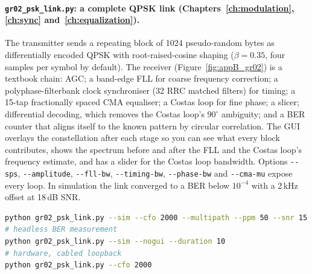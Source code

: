 \paragraph{\texttt{gr02\_psk\_link.py}: a complete QPSK link (Chapters~\ref{ch:modulation},
\ref{ch:sync} and~\ref{ch:equalization}).} The transmitter sends a repeating block of 1024
pseudo-random bytes as differentially encoded QPSK with root-raised-cosine shaping ($\beta=0.35$,
four samples per symbol by default). The receiver (Figure~\ref{fig:appB_gr02}) is a textbook chain: AGC; a band-edge FLL for
coarse frequency correction; a polyphase-filterbank clock synchroniser (32 RRC matched filters) for
timing; a 15-tap fractionally spaced CMA equaliser; a Costas loop for fine phase; a slicer;
differential decoding, which removes the Costas loop's $90^\circ$ ambiguity; and a BER counter that
aligns itself to the known pattern by circular correlation. The GUI overlays the constellation after
each stage so you can see what every block contributes, shows the spectrum before and after the FLL
and the Costas loop's frequency estimate, and has a slider for the Costas loop bandwidth. Options
\texttt{-{}-sps}, \texttt{-{}-amplitude}, \texttt{-{}-fll-bw}, \texttt{-{}-timing-bw}, \texttt{-{}-phase-bw} and
\texttt{-{}-cma-mu} expose every loop. In simulation the link converged to a BER below $10^{-4}$ with a
2\,kHz offset at 18\,dB SNR.
\begin{lstlisting}[language=bash]
python gr02_psk_link.py --sim --cfo 2000 --multipath --ppm 50 --snr 15
# headless BER measurement
python gr02_psk_link.py --sim --nogui --duration 10
# hardware, cabled loopback
python gr02_psk_link.py --cfo 2000
\end{lstlisting}

